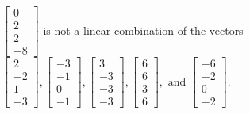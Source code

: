 \begin{exercise}
\begin{exerciseStatement}
  \end{exerciseStatement}
  \begin{exerciseAnswer}
   \(\left[\begin{array}{c}
0 \\
2 \\
2 \\
-8
\end{array}\right]\) 
  	 is not  
	a linear combination of the vectors \(\left[\begin{array}{c}
2 \\
-2 \\
1 \\
-3
\end{array}\right] , \left[\begin{array}{c}
-3 \\
-1 \\
0 \\
-1
\end{array}\right] , \left[\begin{array}{c}
3 \\
-3 \\
-3 \\
-3
\end{array}\right] , \left[\begin{array}{c}
6 \\
6 \\
3 \\
6
\end{array}\right] , \text{ and } \left[\begin{array}{c}
-6 \\
-2 \\
0 \\
-2
\end{array}\right]\).

	
  


  \end{exerciseAnswer}
\end{exercise}